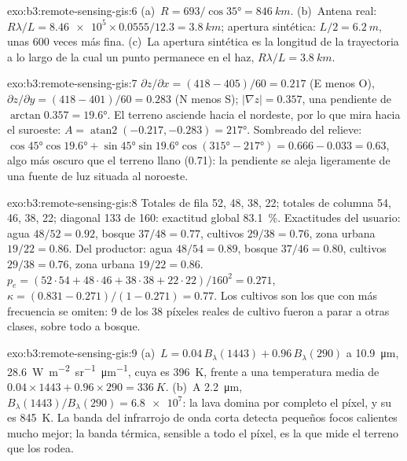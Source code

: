 \begin{solution}{exo:b3:remote-sensing-gis:6}
(a)~$R = 693/\cos\ang{35} = \qty{846}{km}$. (b)~Antena real: $R\lambda/L =
\num{8.46e5}\times0.0555/12.3 = \qty{3.8}{km}$; apertura sintética: $L/2 =
\qty{6.2}{m}$, unas 600 veces más fina. (c)~La apertura sintética es la
longitud de la trayectoria a lo largo de la cual un punto permanece en el haz, $R\lambda/L =
\qty{3.8}{km}$.
\end{solution}

\begin{solution}{exo:b3:remote-sensing-gis:7}
$\partial z/\partial x = (418 - 405)/60 = 0.217$ (E menos O),
$\partial z/\partial y = (418 - 401)/60 = 0.283$ (N menos S);
$|\nabla z| = 0.357$, una pendiente de $\arctan 0.357 = \ang{19.6}$. El terreno
asciende hacia el nordeste, por lo que mira hacia el suroeste: $A =
\operatorname{atan2}(-0.217, -0.283) = \ang{217}$. Sombreado del relieve: $\cos\ang{45}
\cos\ang{19.6} + \sin\ang{45}\sin\ang{19.6}\cos(\ang{315} - \ang{217}) =
0.666 - 0.033 = 0.63$, algo más oscuro que el terreno llano (0.71): la pendiente
se aleja ligeramente de una fuente de luz situada al noroeste.
\end{solution}

\begin{solution}{exo:b3:remote-sensing-gis:8}
Totales de fila 52, 48, 38, 22; totales de columna 54, 46, 38, 22; diagonal 133 de
160: exactitud global \qty{83.1}{\percent}. Exactitudes del usuario: agua
$48/52 = 0.92$, bosque $37/48 = 0.77$, cultivos $29/38 = 0.76$, zona urbana
$19/22 = 0.86$. Del productor: agua $48/54 = 0.89$, bosque $37/46 = 0.80$,
cultivos $29/38 = 0.76$, zona urbana $19/22 = 0.86$. $p_e = (52\cdot54 + 48\cdot46 +
38\cdot38 + 22\cdot22)/160^2 = 0.271$, $\kappa = (0.831 - 0.271)/(1 -
0.271) = 0.77$. Los cultivos son los que con más frecuencia se omiten: 9 de los 38 píxeles reales de cultivo
fueron a parar a otras clases, sobre todo a bosque.
\end{solution}

\begin{solution}{exo:b3:remote-sensing-gis:9}
(a)~$L = 0.04\,B_\lambda(1443) + 0.96\,B_\lambda(290)$ a
\qty{10.9}{\micro\metre}, \qty{28.6}{W.m^{-2}.sr^{-1}.\micro\metre^{-1}},
cuya  es \qty{396}{K}, frente a una temperatura media de
$0.04\times1443 + 0.96\times290 = \qty{336}{K}$. (b)~A
\qty{2.2}{\micro\metre}, $B_\lambda(1443)/B_\lambda(290) = \num{6.8e7}$:
la lava domina por completo el píxel, y su  es
\qty{845}{K}. La banda del infrarrojo de onda corta detecta pequeños focos calientes mucho
mejor; la banda térmica, sensible a todo el píxel, es la que
mide el terreno que los rodea.
\end{solution}


